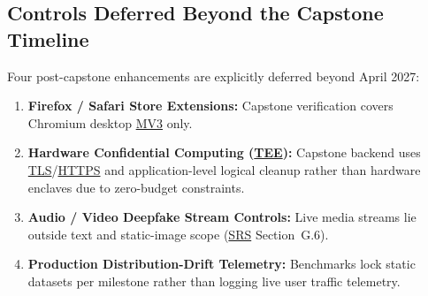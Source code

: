 \documentclass[11pt]{article}
\newcommand{\HTTPS}{\hyperlink{ha-acr-https}{HTTPS}}
\newcommand{\MVThree}{\hyperlink{ha-acr-mv3}{MV3}}
\newcommand{\SRS}{\hyperlink{ha-acr-srs}{SRS}}
\newcommand{\TEE}{\hyperlink{ha-acr-tee}{TEE}}
\newcommand{\TLS}{\hyperlink{ha-acr-tls}{TLS}}
\begin{document}
\subsection{Controls Deferred Beyond the Capstone Timeline}
Four post-capstone enhancements are explicitly deferred beyond April 2027:
\begin{enumerate}[leftmargin=*, noitemsep]
    \item \textbf{Firefox / Safari Store Extensions:} Capstone verification covers Chromium desktop \MVThree{} only.
    \item \textbf{Hardware Confidential Computing (\TEE{}):} Capstone backend uses \TLS{}/\HTTPS{} and application-level logical cleanup rather than hardware enclaves due to zero-budget constraints.
    \item \textbf{Audio / Video Deepfake Stream Controls:} Live media streams lie outside text and static-image scope (\SRS{} Section~G.6).
    \item \textbf{Production Distribution-Drift Telemetry:} Benchmarks lock static datasets per milestone rather than logging live user traffic telemetry.
\end{enumerate}

\newpage

{}
\label{sec:ha-references}
\end{document}

